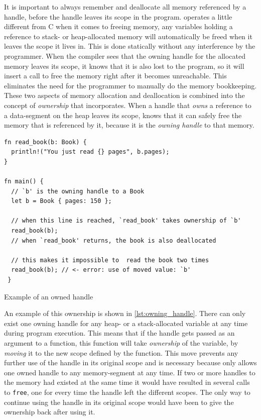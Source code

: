 It is important to always remember and deallocate all memory referenced by a handle, before the handle leaves its scope in the program.
\rust operates a little different from C when it comes to freeing memory, any variables holding a reference to stack- or heap-allocated memory will automatically be freed when it leaves the scope it lives in.
This is done statically without any interference by the programmer.
When the compiler sees that the owning handle for the allocated memory leaves its scope, it knows that it is also lost to the program, so it will insert a call to free the memory right after it becomes unreachable.
This eliminates the need for the programmer to manually do the memory bookkeeping.
These two aspects of memory allocation and deallocation is combined into the concept of \emph{ownership} that \rust incorporates.
When a handle that \emph{owns} a reference to a data-segment on the heap leaves its scope, \rust knows that it can safely free the memory that is referenced by it, because it is the \emph{owning handle} to that memory.

\begin{listing}[tb]
\begin{verbatim}
fn read_book(b: Book) {
  println!("You just read {} pages", b.pages);
}

fn main() {
  // `b' is the owning handle to a Book
  let b = Book { pages: 150 };

  // when this line is reached, `read_book' takes ownership of `b'
  read_book(b);
  // when `read_book' returns, the book is also deallocated

  // this makes it impossible to  read the book two times
  read_book(b); // <- error: use of moved value: `b'
 }
\end{verbatim}
\caption{Example of an owned handle}
\label{lst:owning_handle}
\end{listing}

An example of this ownership is shown in \autoref{lst:owning_handle}.
There can only exist one owning handle for any heap- or a stack-allocated variable at any time during program execution.
This means that if the handle gets passed as an argument to a function, this function will take \emph{ownership} of the variable, by \emph{moving} it to the new scope defined by the function.
This move prevents any further use of the handle in its original scope and is necessary because \rust only allows one owned handle to any memory-segment at any time.
If two or more handles to the memory had existed at the same time it would have resulted in several calls to \texttt{free}, one for every time the handle left the different scopes.
The only way to continue using the handle in its original scope would have been to give the ownership back after using it.

